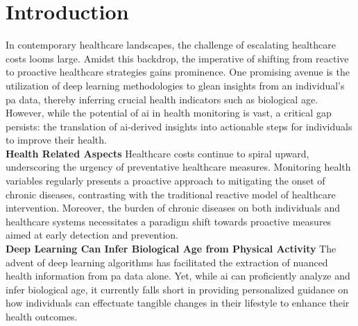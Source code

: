 \section{Introduction}
\label{sec:introduction}





In contemporary healthcare landscapes, the challenge of escalating healthcare costs looms large. Amidst this backdrop, the imperative of shifting from reactive to proactive healthcare strategies gains prominence. One promising avenue is the utilization of deep learning methodologies to glean insights from an individual's \acrfull{pa} data, thereby inferring crucial health indicators such as biological age. However, while the potential of \acrfull{ai} in health monitoring is vast, a critical gap persists: the translation of \acrshort{ai}-derived insights into actionable steps for individuals to improve their health.\\

\textbf{Health Related Aspects} Healthcare costs continue to spiral upward, underscoring the urgency of preventative healthcare measures. Monitoring health variables regularly presents a proactive approach to mitigating the onset of chronic diseases, contrasting with the traditional reactive model of healthcare intervention. Moreover, the burden of chronic diseases on both individuals and healthcare systems necessitates a paradigm shift towards proactive measures aimed at early detection and prevention.\\

\textbf{Deep Learning Can Infer Biological Age from Physical Activity} The advent of deep learning algorithms has facilitated the extraction of nuanced health information from \acrshort{pa} data alone. Yet, while \acrshort{ai} can proficiently analyze and infer biological age, it currently falls short in providing personalized guidance on how individuals can effectuate tangible changes in their lifestyle to enhance their health outcomes.\\

